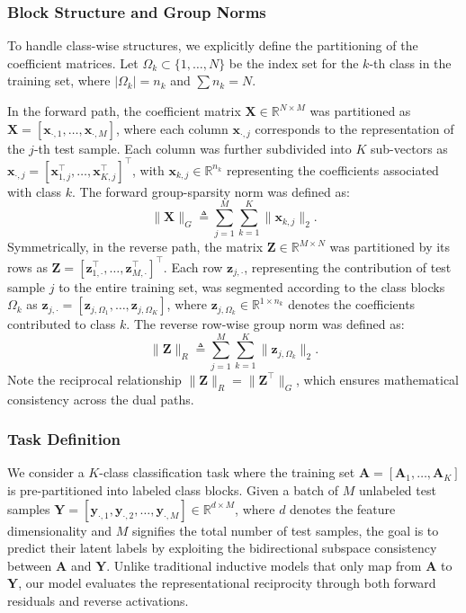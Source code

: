 \documentclass[10pt,comsoc]{IEEEtran}
\begin{document}
\subsubsection{Block Structure and Group Norms}
To handle class-wise structures, we explicitly define the partitioning of the coefficient matrices. Let $\Omega_k \subset \{1, \dots, N\}$ be the index set for the $k$-th class in the training set, where $|\Omega_k| = n_k$ and $\sum n_k = N$. 

In the forward path, the coefficient matrix $\mathbf{X} \in \mathbb{R}^{N \times M}$ was partitioned as $\mathbf{X} = [\mathbf{x}_{\cdot,1}, \dots, \mathbf{x}_{\cdot,M}]$, where each column $\mathbf{x}_{\cdot,j}$ corresponds to the representation of the $j$-th test sample. Each column was further subdivided into $K$ sub-vectors as $\mathbf{x}_{\cdot,j} = [\mathbf{x}_{1,j}^\top, \dots, \mathbf{x}_{K,j}^\top]^\top$, with $\mathbf{x}_{k,j} \in \mathbb{R}^{n_k}$ representing the coefficients associated with class $k$. The forward group-sparsity norm was defined as:
\begin{equation}
\label{eq:group_norm_f}
\|\mathbf{X}\|_G \triangleq \sum_{j=1}^M \sum_{k=1}^K \|\mathbf{x}_{k,j}\|_2.
\end{equation}
Symmetrically, in the reverse path, the matrix $\mathbf{Z} \in \mathbb{R}^{M \times N}$ was partitioned by its rows as $\mathbf{Z} = [\mathbf{z}_{1,\cdot}^\top, \dots, \mathbf{z}_{M,\cdot}^\top]^\top$. Each row $\mathbf{z}_{j,\cdot}$, representing the contribution of test sample $j$ to the entire training set, was segmented according to the class blocks $\Omega_k$ as $\mathbf{z}_{j,\cdot} = [\mathbf{z}_{j,\Omega_1}, \dots, \mathbf{z}_{j,\Omega_K}]$, where $\mathbf{z}_{j,\Omega_k} \in \mathbb{R}^{1 \times n_k}$ denotes the coefficients contributed to class $k$. The reverse row-wise group norm was defined as:
\begin{equation}
\label{eq:group_norm_r}
\|\mathbf{Z}\|_R \triangleq \sum_{j=1}^M \sum_{k=1}^K \|\mathbf{z}_{j,\Omega_k}\|_2.
\end{equation}
Note the reciprocal relationship $\|\mathbf{Z}\|_R = \|\mathbf{Z}^\top\|_G$, which ensures mathematical consistency across the dual paths.

\subsubsection{Task Definition}
We consider a $K$-class classification task where the training set $\mathbf{A} = [\mathbf{A}_1, \dots, \mathbf{A}_K]$ is pre-partitioned into labeled class blocks. Given a batch of $M$ unlabeled test samples $\mathbf{Y} = [\mathbf{y}_{\cdot,1}, \mathbf{y}_{\cdot,2}, \dots, \mathbf{y}_{\cdot,M}] \in \mathbb{R}^{d \times M}$, where $d$ denotes the feature dimensionality and $M$ signifies the total number of test samples, the goal is to predict their latent labels by exploiting the bidirectional subspace consistency between $\mathbf{A}$ and $\mathbf{Y}$. Unlike traditional inductive models that only map from $\mathbf{A}$ to $\mathbf{Y}$, our model evaluates the representational reciprocity through both forward residuals and reverse activations.
\end{document}
